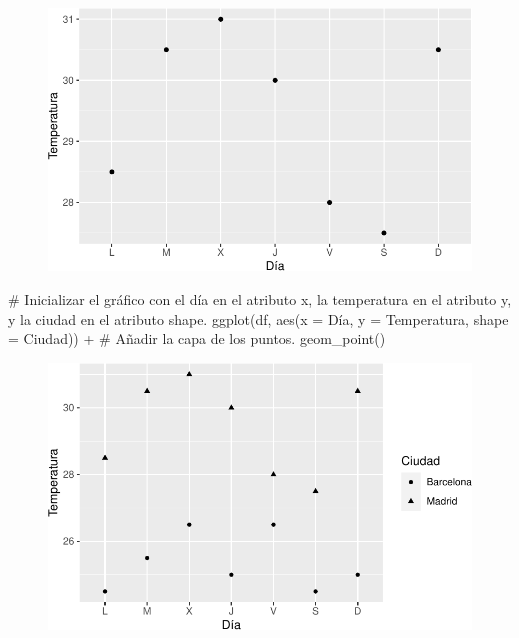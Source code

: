\documentclass[
  a4paper,
]{scrreport}
\newenvironment{Shaded}{\begin{snugshade}}{\end{snugshade}}
\newcommand{\AttributeTok}[1]{\textcolor[rgb]{0.40,0.45,0.13}{#1}}
\newcommand{\CommentTok}[1]{\textcolor[rgb]{0.37,0.37,0.37}{#1}}
\newcommand{\FunctionTok}[1]{\textcolor[rgb]{0.28,0.35,0.67}{#1}}
\newcommand{\NormalTok}[1]{\textcolor[rgb]{0.00,0.23,0.31}{#1}}
\newcommand{\SpecialCharTok}[1]{\textcolor[rgb]{0.37,0.37,0.37}{#1}}
\theoremstyle{definition}
\theoremstyle{definition}
\theoremstyle{remark}
\begin{document}
\begin{figure}[H]

{\centering \includegraphics{./07-graficos_files/figure-pdf/unnamed-chunk-1-1.pdf}

}

\end{figure}

\begin{Shaded}
\begin{Highlighting}[]
\CommentTok{\# Inicializar el gráfico con el día en el atributo x, la temperatura en el atributo y, y la ciudad en el atributo shape.}
\FunctionTok{ggplot}\NormalTok{(df, }\FunctionTok{aes}\NormalTok{(}\AttributeTok{x =}\NormalTok{ Día, }\AttributeTok{y =}\NormalTok{ Temperatura, }\AttributeTok{shape =}\NormalTok{ Ciudad)) }\SpecialCharTok{+}
\CommentTok{\# Añadir la capa de los puntos.}
    \FunctionTok{geom\_point}\NormalTok{()}
\end{Highlighting}
\end{Shaded}

\begin{figure}[H]

{\centering \includegraphics{./07-graficos_files/figure-pdf/unnamed-chunk-2-1.pdf}

}

\end{figure}
\end{document}

